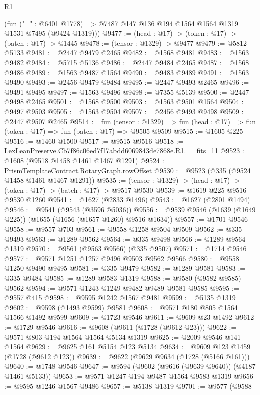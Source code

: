 \begin{lexlean}{R1}
\begin{coremodule}
      (fun ("_" : @6401 @1778) => @7487 @147 @136 @194 @1564 @1564 @1319 @1531 @7495 (@9424 @1319)))
@9477 := (head : @17) -> (token : @17) -> (batch : @17) -> @1445
@9478 := (tensor : @1329) -> @9477
@9479 := @5812 @5133
@9481 := @2447 @9479 @2465
@9482 := @1568 @9481
@9483 := @1563 @9482
@9484 := @5715 @5136
@9486 := @2447 @9484 @2465
@9487 := @1568 @9486
@9489 := @1563 @9487 @1564
@9490 := @9483 @9489
@9491 := @1563 @9490
@9493 := @2456 @9479 @9484
@9495 := @2447 @9493 @2465
@9496 := @9491 @9495
@9497 := @1563 @9496
@9498 := @7355 @5139
@9500 := @2447 @9498 @2465
@9501 := @1568 @9500
@9503 := @1563 @9501 @1564
@9504 := @9497 @9503
@9505 := @1563 @9504
@9507 := @2456 @9493 @9498
@9509 := @2447 @9507 @2465
@9514 := fun (tensor : @1329) =>
  fun (head : @17) => fun (token : @17) => fun (batch : @17) => @9505 @9509
@9515 := @1605 @225
@9516 := @1460 @1500
@9517 := @9515 @9516
@9518 := LexLeanPreserve.Cb7f86c06ed7f17abdd6069843de7868e.R1.__fits_11
@9523 := @1608 (@9518 @1458 @1461 @1467 @1291)
@9524 := PrismTemplateContract.RotaryGraph.rowOffset
@9530 := @9523 (@335 (@9524 @1458 @1461 @1467 @1291))
@9535 := (tensor : @1329) -> (head : @17) -> (token : @17) -> (batch : @17) -> @9517 @9530
@9539 := @1619 @225 @9516 @9530 @1260
@9541 := @1627 (@2833 @1496)
@9543 := @1627 (@2801 @1494)
@9546 := @9541 (@9543 (@3596 @5036))
@9556 := @9539 @9546 (@1639 (@1649 @225)) (@1655 (@1656 (@1657 @1260) @9516 @1634))
@9557 := @1701 @9546
@9558 := @9557 @703
@9561 := @9558 @1258 @9504 @9509
@9562 := @335 @9493
@9563 := @1289 @9562
@9564 := @335 @9498
@9566 := @1289 @9564 @1319
@9570 := @9561 (@9563 @9566) (@335 @9507)
@9571 := @1714 @9546
@9577 := @9571 @1251 @1257 @9496 @9503 @9562 @9566
@9580 := @9558 @1250 @9490 @9495
@9581 := @335 @9479
@9582 := @1289 @9581
@9583 := @335 @9484
@9585 := @1289 @9583 @1319
@9588 := @9580 (@9582 @9585) @9562
@9594 := @9571 @1243 @1249 @9482 @9489 @9581 @9585
@9595 := @9557 @415
@9598 := @9595 @1242 @1567 @9481
@9599 := @5135 @1319
@9602 := @9598 (@1493 @9599) @9581
@9608 := @9571 @180 @805 @1564 @1566 @1492 @9599
@9609 := @1723 @9546
@9611 := @9609 @23 @1492
@9612 := @1729 @9546
@9616 := @9608 (@9611 (@1728 (@9612 @23)))
@9622 := @9571 @803 @194 @1564 @1564 @5134 @1319
@9625 := @2009 @9546 @141 @1564
@9629 := @9625 @161 @5154 @123 @5134
@9634 := @9609 @123 @1459 (@1728 (@9612 @123))
@9639 := @9622 (@9629 @9634 (@1728 (@5166 @161)))
@9640 := @1748 @9546
@9647 := @9594 (@9602 (@9616 (@9639 @9640)) (@4187 @1461 @5133))
@9653 := @9571 @1247 @194 @9487 @1564 @9583 @1319
@9656 := @9595 @1246 @1567 @9486
@9657 := @5138 @1319
@9701 := @9577
    (@9588

\end{coremodule}
\end{lexlean}
